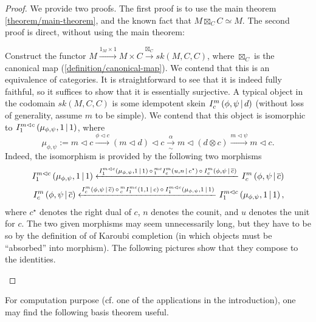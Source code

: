 \begin{proof}
  We provide two proofs. The first proof is to use the main theorem
  \ref{theorem/main-theorem}, and the known fact that
  $M \boxtimes_{C} C \simeq M$. The second proof is direct, without using the
  main theorem:

  Construct the functor
  $M \xrightarrow{1_{M} \times 1} M \times C \xrightarrow{\boxtimes_{C}} sk(M,C,C)$,
  where $\boxtimes_{C}$ is the canonical map (\ref{definition/canonical-map}).
  We contend that this is an equivalence of categories. It is straightforward
  to see that it is indeed fully faithful, so it suffices to show that it is
  essentially surjective. A typical object in the codomain $sk(M,C,C)$ is some
  idempotent skein ${}^{}_{} I^{m}_{c} \left( \phi, \psi \,\middle|\, d \right)$ (without loss of generality,
  assume $m$ to be simple). We contend that this object is isomorphic to
  ${}^{}_{} I^{m \lhd c}_{1} \left( \mu_{\phi, \psi}, 1 \,\middle|\, 1 \right)$, where
  \[
    \mu_{\phi,\psi} :=
    m \lhd c
    \xrightarrow{\phi \lhd c}
    (m \lhd d) \lhd c
    \xrightarrow[\sim]{\alpha}
    m \lhd (d \otimes c)
    \xrightarrow{m \lhd \psi}
    m \lhd c.
  \]
  Indeed, the isomorphism is provided by the following two morphisms
  \begin{align*}
    {}^{}_{} I^{m \lhd c}_{1} \left( \mu_{\phi, \psi}, 1 \,\middle|\, 1 \right)
    \xleftarrow{
    {}^{}_{} I^{m \lhd c}_{1} \left( \mu_{\phi, \psi}, 1 \,\middle|\, 1 \right)
    \, \circ \,
    {}^{mc}_{1} I^{m}_{c} \left( u, n \,\middle|\, c^{\star} \right)
    \, \circ \,
    {}^{}_{} I^{m}_{c} \left( \phi, \psi \,\middle|\, \overline{c} \right)}
    {}^{}_{} I^{m}_{c} \left( \phi, \psi \,\middle|\, \overline{c} \right)
    \\
    {}^{}_{} I^{m}_{c} \left( \phi, \psi \,\middle|\, \overline{c} \right)
    \xleftarrow{
    {}^{}_{} I^{m}_{c} \left( \phi, \psi \,\middle|\, \overline{c} \right)
    \, \circ \,
    {}^{m}_{c} I^{mc}_{1} \left( 1, 1 \,\middle|\, c \right)
    \, \circ \,
    {}^{}_{} I^{m \lhd c}_{1} \left( \mu_{\phi, \psi}, 1 \,\middle|\, 1 \right)
    }
    {}^{}_{} I^{m \lhd c}_{1} \left( \mu_{\phi, \psi}, 1 \,\middle|\, 1 \right),
  \end{align*}
  where $c^{\star}$ denotes the right dual of $c$, $n$ denotes the counit, and
  $u$ denotes the unit for $c$. The two given morphisms may seem unnecessarily
  long, but they have to be so by the definition of of Karoubi completion (in
  which objects must be ``absorbed'' into morphism). The following pictures
  show that they compose to the identities.

  \begin{center}
    
  \end{center}
\end{proof}

\noindent For computation purpose (cf. one of the applications in the introduction), one
may find the following basis theorem useful.

